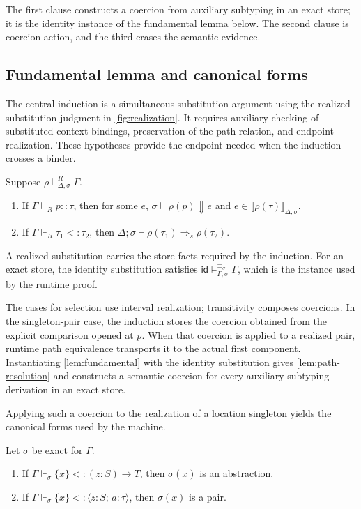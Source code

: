 \documentclass[acmsmall,screen,nonacm]{acmart}
\newcommand{\sing}[1]{\{#1\}}
\newcommand{\pairty}[4]{\langle #1\!:\!#2;\,#3\!:\!#4\rangle}
\newcommand{\resolve}{\Downarrow}
\newcommand{\semmap}{\mathrel{\Rightarrow_{\!s}}}
\newcommand{\runtimeeq}{\mathrel{\equiv_{\sigma}}}
\newcommand{\struct}{\Vdash}
\begin{document}
The first clause constructs a coercion from auxiliary subtyping in an exact
store; it is the identity instance of the fundamental lemma below. The second
clause is coercion action, and the third erases the semantic evidence.

\subsection{Fundamental lemma and canonical forms}

The central induction is a simultaneous substitution argument using the
realized-substitution judgment in \cref{fig:realization}. It requires
auxiliary checking of substituted context bindings, preservation of the path
relation, and endpoint realization. These hypotheses provide the endpoint
needed when the induction crosses a binder.

\begin{lemma}
\label{lem:fundamental}
Suppose \(\rho\models^R_{\Delta,\sigma}\Gamma\).
\begin{enumerate}
\item If \(\Gamma\struct_R p::\tau\), then for some \(e\),
  \(\sigma\vdash\rho(p)\resolve e\) and
  \(e\in\llbracket\rho(\tau)\rrbracket_{\Delta,\sigma}\).
\item If \(\Gamma\struct_R\tau_1<:\tau_2\), then
  \(\Delta;\sigma\vdash
    \rho(\tau_1)\semmap\rho(\tau_2)\).
\end{enumerate}
\end{lemma}

A realized substitution carries the store facts required by the induction.
For an exact store, the identity substitution satisfies
\(\mathsf{id}\models^{\runtimeeq}_{\Gamma,\sigma}\Gamma\), which is the
instance used by the runtime proof.

The cases for selection use interval realization; transitivity composes
coercions. In the singleton-pair case, the induction stores the coercion
obtained from the explicit comparison opened at \(p\). When that coercion is
applied to a realized pair, runtime path equivalence transports it to the
actual first component. Instantiating \cref{lem:fundamental} with the identity
substitution gives \cref{lem:path-resolution} and constructs a semantic
coercion for every auxiliary subtyping derivation in an exact store.

Applying such a coercion to the realization of a location singleton yields
the canonical forms used by the machine.

\begin{lemma}
\label{lem:canonical}
Let \(\sigma\) be exact for \(\Gamma\).
\begin{enumerate}
\item If \(\Gamma\struct_{\sigma}\sing{x}<:(z:S)\to T\), then
  \(\sigma(x)\) is an
  abstraction.
\item If \(\Gamma\struct_{\sigma}\sing{x}<:\pairty{z}{S}{a}{\tau}\), then
  \(\sigma(x)\) is a pair.
\end{enumerate}
\end{lemma}
\end{document}
